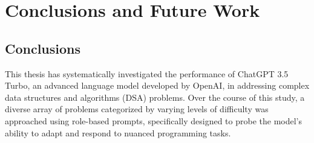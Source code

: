 








\chapter{Conclusions and Future Work}
\label{ch:conclusions}

\section{Conclusions}
This thesis has systematically investigated the performance of ChatGPT 3.5 Turbo, an advanced language model developed by OpenAI, in addressing complex data structures and algorithms (DSA) problems. Over the course of this study, a diverse array of problems categorized by varying levels of difficulty was approached using role-based prompts, specifically designed to probe the model's ability to adapt and respond to nuanced programming tasks.


